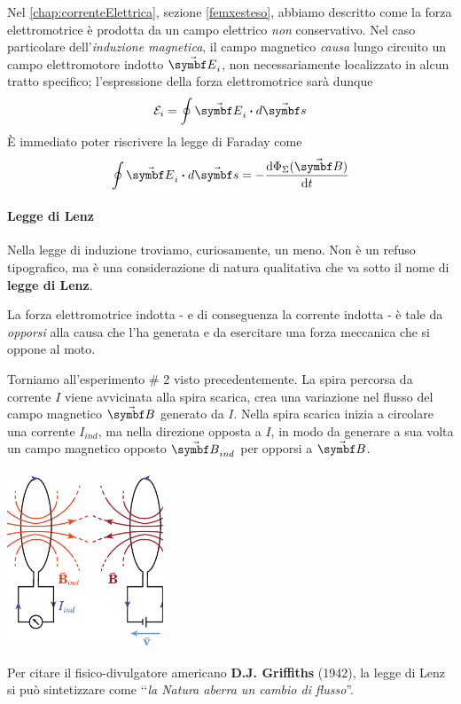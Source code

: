 \begin{observe} %
	Nel \autoref{chap:correnteElettrica}, sezione \ref{femxesteso}, abbiamo descritto come la forza elettromotrice è prodotta da un campo elettrico \textit{non} conservativo. Nel caso particolare dell'\textit{induzione magnetica}, il campo magnetico \textit{causa} lungo circuito un campo elettromotore indotto $\vba{E}_i$, non necessariamente localizzato in alcun tratto specifico; l'espressione della forza elettromotrice sarà dunque
	\begin{equation*}
		\mathcal{E}_i=\oint\vba{E}_i\vdot d\vba{s}
	\end{equation*}
	È immediato poter riscrivere la legge di Faraday come
	\begin{equation}
		\oint \vba E_i\vdot d\vba s =-\dv{\Phi_{\Sigma}(\vba B)}{t}		
	\end{equation}
\end{observe}
\paragraph{Legge di Lenz}
Nella legge di induzione troviamo, curiosamente, un meno. Non è un refuso tipografico, ma è una considerazione di natura qualitativa che va sotto il nome di \textbf{legge di Lenz}.
\begin{corollaryqed}
	La forza elettromotrice indotta - e di conseguenza la corrente indotta - è tale da \textit{opporsi} alla causa che l'ha generata e da esercitare una forza meccanica che si oppone al moto. 
\end{corollaryqed}
\begin{observe}
	Torniamo all'esperimento \# 2 visto precedentemente. La spira percorsa da corrente $I$ viene avvicinata alla spira scarica, crea una variazione nel flusso del campo magnetico $\vba{B}$ generato da $I$. Nella spira scarica inizia a circolare una corrente $I_{ind}$, ma nella direzione opposta a $I$, in modo da generare a sua volta un campo magnetico opposto $\vba{B}_{ind}$ per opporsi a $\vba{B}$.
	\begin{center}
		\includegraphics[width=0.35\textwidth]{images/chp10/chp10esperimento2aoss.pdf}
	\end{center}
\end{observe}
Per citare il fisico-divulgatore americano \textbf{D.J. Griffiths} (1942), la legge di Lenz si può sintetizzare come ‘‘\textit{la Natura aberra un cambio di flusso}''.
